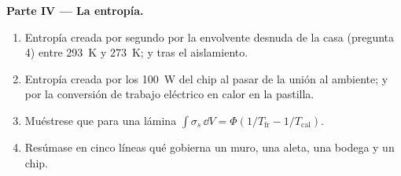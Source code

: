 \begin{problem}
\textbf{Parte IV --- La entropía.}
\begin{enumerate}[resume]
  \item Entropía creada por segundo por la envolvente desnuda de la casa
        (pregunta 4) entre \qty{293}{K} y \qty{273}{K}; y tras
        el aislamiento.
  \item Entropía creada por los \qty{100}{W} del chip al pasar de la
        unión al ambiente; y por la conversión de trabajo eléctrico
        en calor en la pastilla.
  \item Muéstrese que para una lámina $\int\sigma_s\,\dd V = \Phi(1/T_{\text{fr}} -
        1/T_{\text{cal}})$.
  \item Resúmase en cinco líneas qué gobierna un muro, una aleta, una bodega
        y un chip.
\end{enumerate}
\end{problem}
